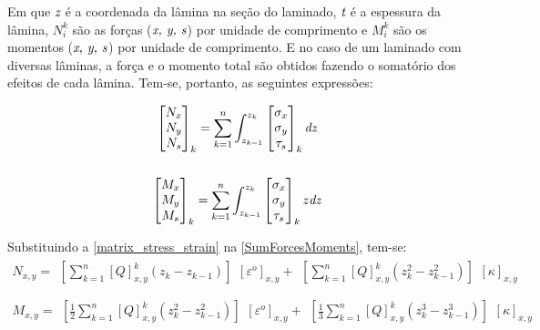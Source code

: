 Em que $\emph{z}$ é a coordenada da lâmina na seção do laminado, $\emph{t}$ é a espessura da lâmina, $N^k_i$ são as forças ($\emph{x, y, s}$) por unidade de comprimento e $M^k_i$ são os momentos ($\emph{x, y, s}$) por unidade de comprimento. E no caso de um laminado com diversas lâminas, a força e o momento total são obtidos fazendo o somatório dos efeitos de cada lâmina. Tem-se, portanto, as seguintes expressões:

\begin{equation} \label{SumForcesMoments}
\begin{gathered}
\begin{bmatrix}
    N_{x} \\
    N_{y} \\
    N_{s} \\
\end{bmatrix}_k
= \sum^n_{k=1} \int^{z_k}_{z_{k-1}}
\begin{bmatrix}
    \sigma_{x} \\
    \sigma_{y} \\
    \tau_{s} \\
\end{bmatrix}_k
\emph{dz} \\~\\
\begin{bmatrix}
    M_{x} \\
    M_{y} \\
    M_{s} \\
\end{bmatrix}_k
= \sum^n_{k=1} \int^{z_k}_{z_{k-1}}
\begin{bmatrix}
    \sigma_{x} \\
    \sigma_{y} \\
    \tau_{s} \\
\end{bmatrix}_k
z\emph{dz}
\end{gathered}
\end{equation}

Substituindo a \autoref{matrix_stress_strain} na \autoref{SumForcesMoments}, tem-se:
\begin{equation} \label{SumForcesMoments_general}
\begin{gathered}
N_{x,y} =
\begin{matrix}
[\sum^n_{k=1}[Q]^k_{x,y}({z_k} -{z_{k-1}})]
\end{matrix}
[\varepsilon^o]_{x,y} +
\begin{matrix}
[\sum^n_{k=1}[Q]^k_{x,y}({z^2_k} -{z^2_{k-1}})]
\end{matrix}
[\kappa]_{x,y}\\~\\
M_{x,y} =
\begin{matrix}
[\frac{1}{2}\sum^n_{k=1}[Q]^k_{x,y}({z^2_k} -{z^2_{k-1}})]
\end{matrix}
[\varepsilon^o]_{x,y} +
\begin{matrix}
[\frac{1}{3}\sum^n_{k=1}[Q]^k_{x,y}({z^3_k} -{z^3_{k-1}})]
\end{matrix}
[\kappa]_{x,y}
\end{gathered}
\end{equation}

